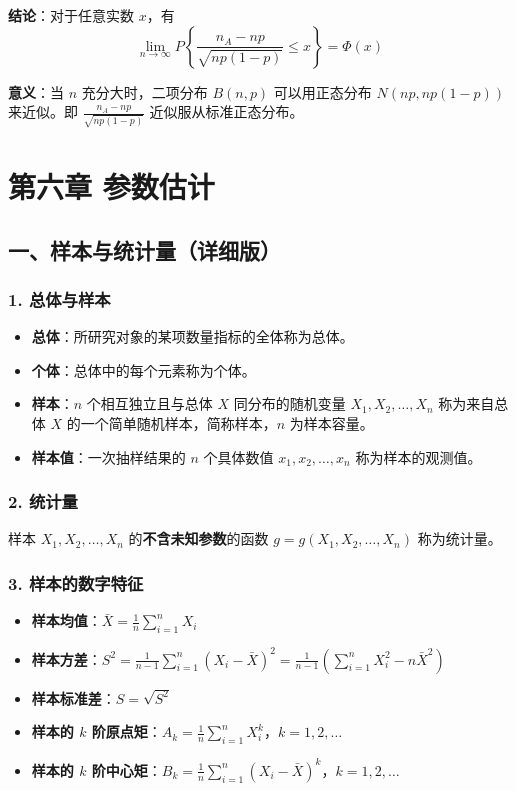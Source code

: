 \documentclass[12pt,a4paper]{ctexart}
\begin{document}
\textbf{结论}：对于任意实数 $x$，有
\[ \lim_{n \to \infty} P\left\{\frac{n_A - np}{\sqrt{np(1-p)}} \le x\right\} = \Phi(x) \]

\textbf{意义}：当 $n$ 充分大时，二项分布 $B(n, p)$ 可以用正态分布 $N(np, np(1-p))$ 来近似。即 $\frac{n_A - np}{\sqrt{np(1-p)}}$ 近似服从标准正态分布。

\newpage
\section{第六章 参数估计}

\subsection{一、样本与统计量（详细版）}

\subsubsection{1. 总体与样本}
\begin{itemize}[noitemsep]
    \item \textbf{总体}：所研究对象的某项数量指标的全体称为总体。
    \item \textbf{个体}：总体中的每个元素称为个体。
    \item \textbf{样本}：$n$ 个相互独立且与总体 $X$ 同分布的随机变量 $X_1, X_2, \dots, X_n$ 称为来自总体 $X$ 的一个简单随机样本，简称样本，$n$ 为样本容量。
    \item \textbf{样本值}：一次抽样结果的 $n$ 个具体数值 $x_1, x_2, \dots, x_n$ 称为样本的观测值。
\end{itemize}

\subsubsection{2. 统计量}
样本 $X_1, X_2, \dots, X_n$ 的\textbf{不含未知参数}的函数 $g = g(X_1, X_2, \dots, X_n)$ 称为统计量。

\subsubsection{3. 样本的数字特征}
\begin{itemize}[noitemsep]
    \item \textbf{样本均值}：$\bar{X} = \frac{1}{n} \sum_{i=1}^n X_i$
    \item \textbf{样本方差}：$S^2 = \frac{1}{n-1} \sum_{i=1}^n (X_i - \bar{X})^2 = \frac{1}{n-1} \left( \sum_{i=1}^n X_i^2 - n\bar{X}^2 \right)$
    \item \textbf{样本标准差}：$S = \sqrt{S^2}$
    \item \textbf{样本的 $k$ 阶原点矩}：$A_k = \frac{1}{n} \sum_{i=1}^n X_i^k$，$k = 1, 2, \dots$
    \item \textbf{样本的 $k$ 阶中心矩}：$B_k = \frac{1}{n} \sum_{i=1}^n (X_i - \bar{X})^k$，$k = 1, 2, \dots$
\end{itemize}
\end{document}
